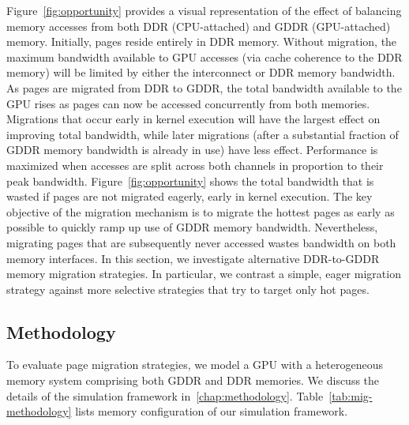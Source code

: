 Figure~\ref{fig:opportunity} provides a visual representation of the effect of
balancing memory accesses from both DDR (CPU-attached) and GDDR (GPU-attached)
memory. Initially, pages reside entirely in DDR memory.  Without migration, the
maximum bandwidth available to GPU accesses (via cache coherence to the DDR
memory)  will be limited by either the interconnect or DDR memory bandwidth.  As
pages are migrated from DDR to GDDR, the total bandwidth available to the GPU
rises as pages can now be accessed concurrently from both memories.  Migrations
that occur early in kernel execution will have the largest effect on improving
total bandwidth, while later migrations (after a substantial fraction of GDDR
memory bandwidth is already in use) have less effect.  Performance is maximized
when accesses are split across both channels in proportion to their peak
bandwidth.  Figure~\ref{fig:opportunity} shows the total bandwidth that is
wasted if pages are not migrated eagerly, early in kernel execution.  The key
objective of the migration mechanism is to migrate the hottest pages as early as
possible to quickly ramp up use of GDDR memory bandwidth.  Nevertheless,
migrating pages that are subsequently never accessed wastes bandwidth on both
memory interfaces.  In this section, we investigate alternative DDR-to-GDDR
memory migration strategies.  In particular, we contrast a simple, eager
migration strategy against more selective strategies that try to target only hot
pages.

\subsection{Methodology}
To evaluate page migration strategies, we model a GPU with a heterogeneous 
memory system comprising both  GDDR and DDR memories. We discuss the details of
the simulation framework in~\ref{chap:methodology}.
%
Table~\ref{tab:mig-methodology} lists memory configuration of our simulation
framework.

